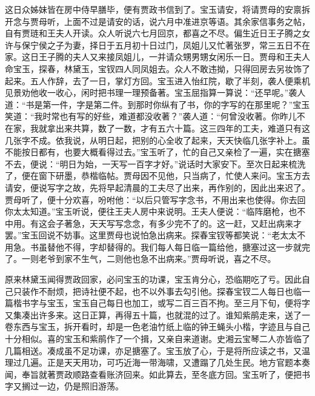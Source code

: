 \begin{parag}


    这日众姊妹皆在房中侍早膳毕，便有贾政书信到了。宝玉请安，将请贾母的安禀拆开念与贾母听，上面不过是请安的话，说六月中准进京等语。其余家信事务之帖，自有贾琏和王夫人开读。众人听说六七月回京，都喜之不尽。偏生近日王子腾之女许与保宁侯之子为妻，择日于五月初十日过门，凤姐儿又忙著张罗，常三五日不在家。这日王子腾的夫人又来接凤姐儿，一并请众甥男甥女闲乐一日。贾母和王夫人命宝玉，探春，林黛玉，宝钗四人同凤姐去。众人不敢违拗，只得回房去另妆饰了起来。五人作辞，去了一日，掌灯方回。宝玉进入怡红院，歇了半刻，袭人便乘机见景劝他收一收心，闲时把书理一理预备著。宝玉屈指算一算说：“还早呢。”袭人道：“书是第一件，字是第二件。到那时你纵有了书，你的字写的在那里呢？”宝玉笑道：“我时常也有写的好些，难道都没收著？”袭人道：“何曾没收著。你昨儿不在家，我就拿出来共算，数了一数，才有五六十篇。这三四年的工夫，难道只有这几张字不成。依我说，从明日起，把别的心全收了起来，天天快临几张字补上。虽不能按日都有，也要大概看得过去。”宝玉听了，忙的自己又亲检了一遍，实在搪塞不去，便说：“明日为始，一天写一百字才好。”说话时大家安下。至次日起来梳洗了，便在窗下研墨，恭楷临帖。贾母因不见他，只当病了，忙使人来问。宝玉方去请安，便说写字之故，先将早起清晨的工夫尽了出来，再作别的，因此出来迟了。贾母听了，便十分欢喜，吩咐他：“以后只管写字念书，不用出来也使得。你去回你太太知道。”宝玉听说，便往王夫人房中来说明。王夫人便说：“临阵磨枪，也不中用。有这会子著急，天天写写念念，有多少完不了的。这一赶，又赶出病来才罢。”宝玉回说不妨事。这里贾母也说怕急出病来。探春宝钗等都笑说：“老太太不用急。书虽替他不得，字却替得的。我们每人每日临一篇给他，搪塞过这一步就完了。一则老爷到家不生气，二则他也急不出病来。”贾母听说，喜之不尽。
\end{parag}


\begin{parag}


    原来林黛玉闻得贾政回家，必问宝玉的功课，宝玉肯分心，恐临期吃了亏。因此自己只装作不耐烦，把诗社便不起，也不以外事去勾引他。探春宝钗二人每日也临一篇楷书字与宝玉，宝玉自己每日也加工，或写二百三百不拘。至三月下旬，便将字又集凑出许多来。这日正算，再得五十篇，也就混的过了。谁知紫鹃走来，送了一卷东西与宝玉，拆开看时，却是一色老油竹纸上临的钟王蝇头小楷，字迹且与自己十分相似。喜的宝玉和紫鹃作了一个揖，又亲自来道谢。史湘云宝琴二人亦皆临了几篇相送。凑成虽不足功课，亦足搪塞了。宝玉放了心，于是将所应读之书，又温理过几遍。正是天天用功，可巧近海一带海啸，又遭蹋了几处生民。地方官题本奏闻，奉旨就著贾政顺路查看账济回来。如此算去，至冬底方回。宝玉听了，便把书字又搁过一边，仍是照旧游荡。
\end{parag}


